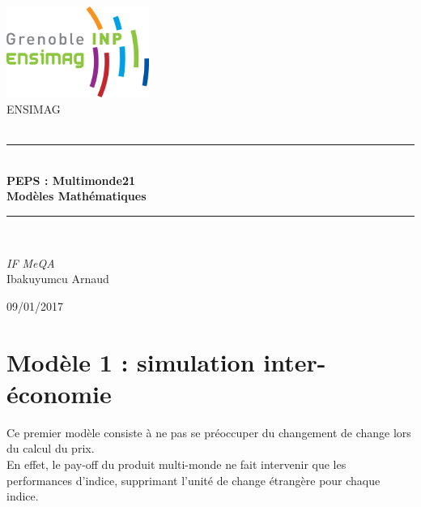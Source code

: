 \documentclass[a4paper,12pt]{article}
\newcommand{\HRule}{\rule{\linewidth}{0.5mm}} %
\begin{document}
\begin{titlepage}
\begin{center}

\includegraphics[width=0.35\textwidth]{logo}~\\[2.5cm] %

\textsc{\LARGE ENSIMAG}\\[1.5cm]
\textsc{\Large }\\[0.5cm]

\HRule \\[0.4cm]

{\huge \bfseries PEPS : Multimonde21\\[0.5cm]
Modèles Mathématiques\\[0.4cm] }

\HRule \\[1.5cm]

\begin{minipage}{0.4\textwidth}
\begin{center} \large
\emph{IF MeQA}\\[2cm]
Ibakuyumcu Arnaud
\end{center}
\end{minipage}
\begin{minipage}{0.4\textwidth}
\end{minipage}

\vfill

\large {09/01/2017 }

\end{center}

\end{titlepage}
 \newpage


 \tableofcontents %
 \newpage


\section{Modèle 1 : simulation inter-économie}
Ce premier modèle consiste à ne pas se préoccuper du changement de change lors du calcul du prix. \\
En effet, le pay-off du produit multi-monde ne fait intervenir que les performances d'indice, supprimant l'unité de change étrangère pour chaque indice.
\end{document}
